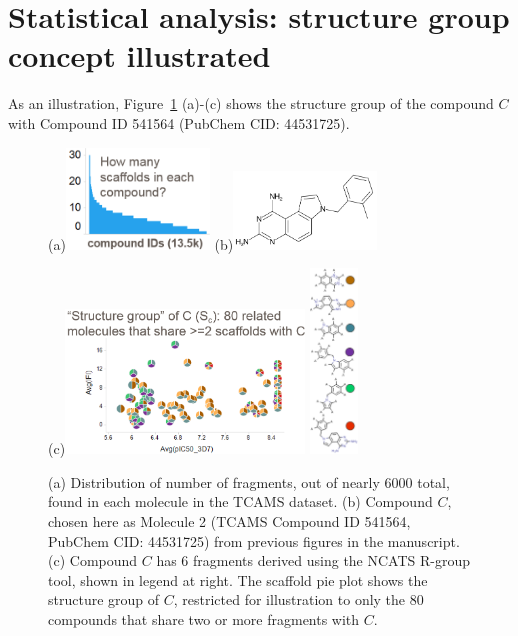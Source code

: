 \documentclass[11pt,letterpaper]{article}
\newcommand*\fref[1]{Figure~\ref{fig:#1}}
\begin{document}
\newpage
\section{Statistical analysis: structure group concept illustrated}
\label{sec:strucgroup}
As an illustration, \fref{strucgroup} (a)-(c) shows the structure group of the compound $C$ with Compound ID 541564 (PubChem CID: 44531725). 
\begin{figure}
\centering
  \begin{minipage}[b][0.2\textheight][s]{0.7\textwidth}
  \centering
  (a)\includegraphics[width=1.5in]{../fig/howmany_scaf.png}
  (b)\includegraphics[width=1.5in]{../fig/tcam2_mol_541564.png}
  \end{minipage}
  (c)\includegraphics[width=2.5in]{../fig/structure_group_C.png}
  \includegraphics[width=0.5in]{../fig/tcam2_541564_6scaf_col.png}
  \caption{
    (a) Distribution of number of fragments, out of nearly 6000 total, found in each molecule in the TCAMS dataset. (b) Compound $C$, chosen here as Molecule 2 (TCAMS Compound ID 541564, PubChem CID: 44531725) from previous figures in the manuscript.
    (c) Compound $C$ has 6 fragments derived using the NCATS R-group tool, shown in legend at right. The scaffold pie plot shows the structure group of $C$, restricted for illustration to only the 80 compounds that share two or more fragments with $C$.} %
    \label{fig:strucgroup}
\end{figure}
\end{document}
